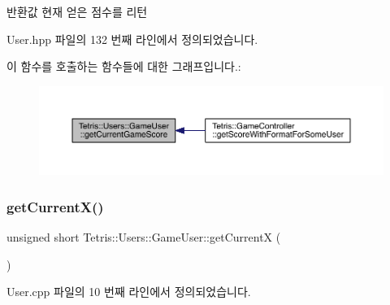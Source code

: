 \begin{DoxyReturn}{반환값}
현재 얻은 점수를 리턴 
\end{DoxyReturn}


User.\+hpp 파일의 132 번째 라인에서 정의되었습니다.

이 함수를 호출하는 함수들에 대한 그래프입니다.\+:
\nopagebreak
\begin{figure}[H]
\begin{center}
\leavevmode
\includegraphics[width=350pt]{class_tetris_1_1_users_1_1_game_user_a93bde8123ee0dc9333d62a44b904023c_icgraph}
\end{center}
\end{figure}
\mbox{\label{class_tetris_1_1_users_1_1_game_user_ad25eace96bd27ae6df4a0c0d506be730}} 
\subsubsection{\texorpdfstring{get\+Current\+X()}{getCurrentX()}\hspace{0.1cm}{\footnotesize\ttfamily [1/2]}}
{\footnotesize\ttfamily unsigned short Tetris\+::\+Users\+::\+Game\+User\+::get\+CurrentX (\begin{DoxyParamCaption}{ }\end{DoxyParamCaption})}



User.\+cpp 파일의 10 번째 라인에서 정의되었습니다.

